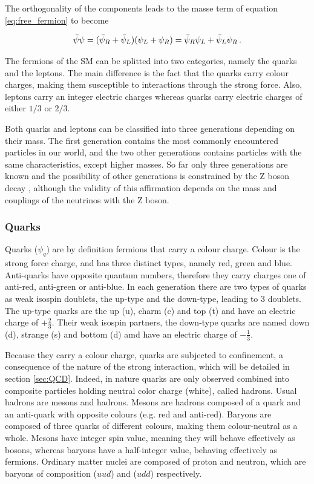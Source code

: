 The orthogonality of the components leads to the masse term of equation \ref{eq:free_fermion} to become

\begin{equation}
    \Bar{\psi}\psi = (\Bar{\psi}_R + \Bar{\psi}_L)(\psi_L + \psi_R) = \Bar{\psi}_R \psi_L + \Bar{\psi}_L \psi_R \mend
    \label{eq:chiral_fermions}
\end{equation}

The fermions of the SM can be splitted into two categories, namely the quarks and the leptons. The main difference is the fact that the quarks carry colour charges, making them susceptible to interactions through the strong force. Also, leptons carry an integer electric charges whereas quarks carry electric charges of either $1/3$ or $2/3$.

Both quarks and leptons can be classified into three generations depending on their mass. The first generation contains the most commonly encountered particles in our world, and the two other generations contains particles with the same characteristics, except higher masses. So far only three generations are known and the possibility of other generations is constrained by the Z boson decay \cite{2006257}, although the validity of this affirmation depends on the mass and couplings of the neutrinos with the Z boson.

\subsubsection{Quarks}

Quarks ($\psi_q$) are by definition fermions that carry a colour charge. Colour is the strong force charge, and has three distinct types, namely red, green and blue. Anti-quarks have opposite quantum numbers, therefore they carry charges one of anti-red, anti-green or anti-blue. In each generation there are two types of quarks as weak isospin doublets, the up-type and the down-type, leading to 3 doublets. The up-type quarks are the up (u), charm (c) and top (t) and have an electric charge of $+\frac{2}{3}$. Their weak isospin partners, the down-type quarks are named down (d), strange (s) and bottom (d) amd have an electric charge of $-\frac{1}{3}$.

Because they carry a colour charge, quarks are subjected to confinement, a consequence of the nature of the strong interaction, which will be detailed in section \ref{sec:QCD}. Indeed, in nature quarks are only observed combined into composite particles holding neutral color charge (white), called hadrons. Usual hadrons are mesons and hadrons. Mesons are hadrons composed of a quark and an anti-quark with opposite colours (e.g. red and anti-red). Baryons are composed of three quarks of different colours, making them colour-neutral as a whole. Mesons have integer spin value, meaning they will behave effectively as bosons, whereas baryons have a half-integer value, behaving effectively as fermions. Ordinary matter nuclei are composed of proton and neutron, which are baryons of composition ($uud$) and ($udd$) respectively.

